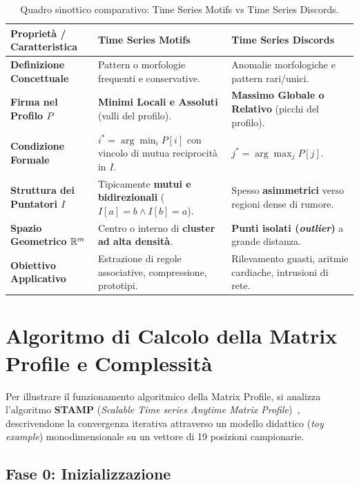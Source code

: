 \begin{table}[H]
\centering
\small
\caption{Quadro sinottico comparativo: Time Series Motifs vs Time Series Discords.}
\label{tab:ts-motifs-vs-discords}
\vspace{2mm}
\begin{tabularx}{\textwidth}{p{3.8cm} Y Y}
\toprule
\textbf{Propriet\`a / Caratteristica} & \textbf{Time Series Motifs} & \textbf{Time Series Discords} \\
\midrule
\textbf{Definizione Concettuale} & Pattern o morfologie frequenti e conservative. & Anomalie morfologiche e pattern rari/unici. \\
\addlinespace
\textbf{Firma nel Profilo $P$} & \textbf{Minimi Locali e Assoluti} (valli del profilo). & \textbf{Massimo Globale o Relativo} (picchi del profilo). \\
\addlinespace
\textbf{Condizione Formale} & $i^* = \arg\min_i P[i]$ con vincolo di mutua reciprocit\`a in $I$. & $j^* = \arg\max_j P[j]$. \\
\addlinespace
\textbf{Struttura dei Puntatori $I$} & Tipicamente \textbf{mutui e bidirezionali} ($I[a]=b \land I[b]=a$). & Spesso \textbf{asimmetrici} verso regioni dense di rumore. \\
\addlinespace
\textbf{Spazio Geometrico $\mathbb{R}^m$} & Centro o interno di \textbf{cluster ad alta densit\`a}. & \textbf{Punti isolati (\textit{outlier})} a grande distanza. \\
\addlinespace
\textbf{Obiettivo Applicativo} & Estrazione di regole associative, compressione, prototipi. & Rilevamento guasti, aritmie cardiache, intrusioni di rete. \\
\bottomrule
\end{tabularx}
\end{table}

\FloatBarrier
\section{Algoritmo di Calcolo della Matrix Profile e Complessit\`a}
\label{sec:ts-mp-algorithm-complexity}

Per illustrare il funzionamento algoritmico della Matrix Profile, si analizza l'algoritmo \textbf{STAMP} (\textit{Scalable Time series Anytime Matrix Profile})~\cite{yeh2016}, descrivendone la convergenza iterativa attraverso un modello didattico (\textit{toy example}) monodimensionale su un vettore di 19 posizioni campionarie.

\FloatBarrier
\subsection{Fase 0: Inizializzazione}
\label{subsec:ts-algo-phase0}

